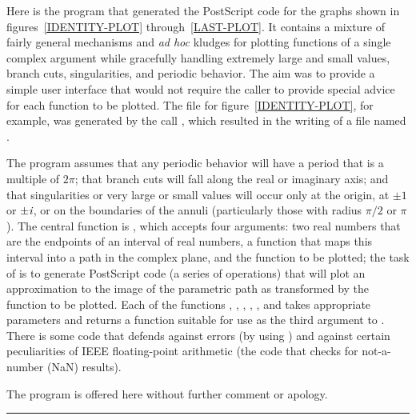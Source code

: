 \begin{new}
Here is the program that generated the PostScript code for
the graphs shown in figures~\ref{IDENTITY-PLOT} through~\ref{LAST-PLOT}.
It contains a mixture of fairly general mechanisms and \emph{ad hoc} kludges
for plotting functions of a single complex argument while gracefully handling
extremely large and small values,
branch cuts, singularities, and periodic behavior.
The aim was to provide a simple user interface that would not
require the caller to provide special advice for each function
to be plotted.
The file for figure~\ref{IDENTITY-PLOT}, for example, was generated
by the call , which resulted in the writing of
a file named .

The program assumes that any periodic behavior will have a period that is a multiple of
$2\pi$; that branch cuts will fall along the real or imaginary axis;
and that singularities or very large or small values
will occur only at the origin, at $\pm 1$ or $\pm \emph{i}$,
or on the boundaries of the annuli (particularly those with radius $\pi/2$ or $\pi$).
The central function is , which accepts four arguments:
two real numbers that are the endpoints of an interval of real numbers,
a function that maps this interval into a path in the complex plane,
and the function to be plotted; the task of  is to
generate PostScript code (a series of  operations)
that will plot an approximation to the image of the parametric path
as transformed by the function to be plotted.
Each of the functions , , , , ,
and  takes appropriate parameters
and returns a function suitable for use as the third argument
to .
There is some code that defends against errors
(by using ) and against certain peculiarities of
IEEE floating-point arithmetic (the code that checks for not-a-number (NaN) results).

The program is offered here without further comment or apology.

\hrule width 0pt\relax


\end{new}
